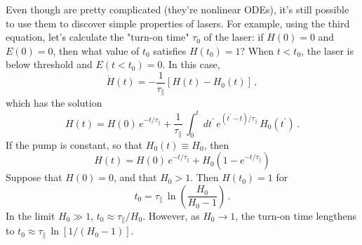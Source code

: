 Even though  are pretty complicated (they're nonlinear ODEs), it's still possible to use them to discover simple properties of lasers. For example, using the third equation, let's calculate the "turn-on time" $\tau_0$ of the laser: if $H(0) = 0$ and $E(0) = 0$, then what value of $t_0$ satisfies $H(t_0) = 1$? When $t < t_0$, the laser is below threshold and $E(t < t_0) = 0$. In this case,
 \begin{equation}
   \dot{H}(t) = -\frac{1}{\tau_\parallel} \left[ H(t) - H_0(t)\right]\, ,
 \end{equation}
 which has the solution
 \begin{equation}
   H(t) = H(0)\, e^{-t/\tau_\parallel} + \frac{1}{\tau_\parallel}\, \int_0^t\, d t^\prime\, e^{(t^\prime - t)/\tau_\parallel}\, H_0(t^\prime)\, .
 \end{equation}
 If the pump is constant, so that $H_0(t) \equiv H_0$, then
 \begin{equation}
   H(t) = H(0)\, e^{-t/\tau_\parallel} + H_0 \left( 1 - e^{-t/\tau_\parallel} \right)
 \end{equation}
 Suppose that $H(0) = 0$, and that $H_0 > 1$. Then $H(t_0) = 1$ for
 \begin{equation}
   t_0 = \tau_\parallel\, \ln\left(\frac{H_0}{H_0 - 1}\right)\, .
 \end{equation}
 In the limit $H_0 \gg 1$, $t_0 \approx \tau_\parallel/H_0$. However, as $H_0 \rightarrow 1$, the turn-on time lengthens to $t_0 \approx \tau_\parallel\, \ln[1/(H_0 - 1)]$.
 
